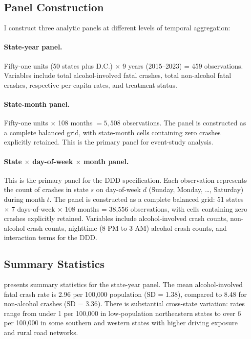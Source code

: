 \documentclass[12pt]{article}
\begin{document}
\subsection{Panel Construction}

I construct three analytic panels at different levels of temporal aggregation:

\paragraph{State-year panel.} Fifty-one units (50 states plus D.C.) $\times$ 9 years (2015--2023) = 459 observations. Variables include total alcohol-involved fatal crashes, total non-alcohol fatal crashes, respective per-capita rates, and treatment status.

\paragraph{State-month panel.} Fifty-one units $\times$ 108 months $= 5{,}508$ observations. The panel is constructed as a complete balanced grid, with state-month cells containing zero crashes explicitly retained. This is the primary panel for event-study analysis.

\paragraph{State $\times$ day-of-week $\times$ month panel.} This is the primary panel for the DDD specification. Each observation represents the count of crashes in state $s$ on day-of-week $d$ (Sunday, Monday, \ldots, Saturday) during month $t$. The panel is constructed as a complete balanced grid: 51 states $\times$ 7 days-of-week $\times$ 108 months = 38,556 observations, with cells containing zero crashes explicitly retained. Variables include alcohol-involved crash counts, non-alcohol crash counts, nighttime (8 PM to 3 AM) alcohol crash counts, and interaction terms for the DDD.

\subsection{Summary Statistics}

 presents summary statistics for the state-year panel. The mean alcohol-involved fatal crash rate is 2.96 per 100,000 population (SD = 1.38), compared to 8.48 for non-alcohol crashes (SD = 3.36). There is substantial cross-state variation: rates range from under 1 per 100,000 in low-population northeastern states to over 6 per 100,000 in some southern and western states with higher driving exposure and rural road networks.
\end{document}

